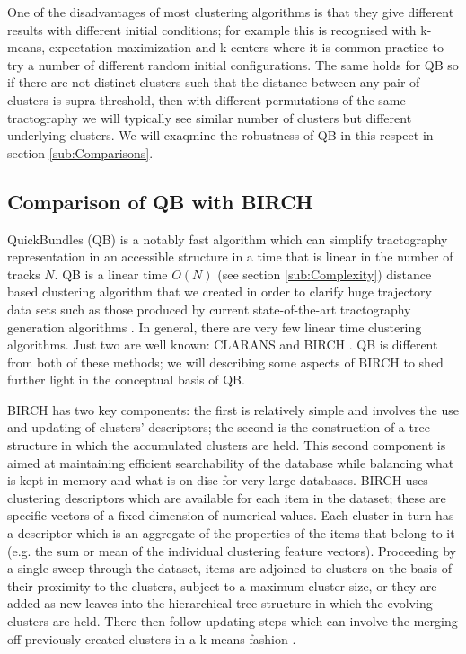\documentclass[preprint,authoryear,a4paper,10pt,onecolumn]{elsarticle}
\begin{document}
One of the disadvantages of most clustering algorithms is that they give
different results with different initial conditions; for example this is
recognised with k-means, expectation-maximization
\citep{dempster1977maximum} and k-centers \citep{gonzalez1985clustering}
where it is common practice to try a number of different random initial
configurations. The same holds for QB so if there are not distinct
clusters such that the distance between any pair of clusters is
supra-threshold, then with different permutations of the same
tractography we will typically see similar number of clusters but
different underlying clusters. We will exaqmine the robustness of QB in
this respect in section \ref{sub:Comparisons}.

\subsection{Comparison of QB with BIRCH}

QuickBundles (QB) is a notably fast algorithm which can simplify
tractography representation in an accessible structure in a time that is
linear in the number of tracks $N$. QB is a linear time $O(N)$ (see
section \ref{sub:Complexity}) distance based clustering algorithm that
we created in order to clarify huge trajectory data sets such as those
produced by current state-of-the-art tractography generation algorithms
\citep{Parker2003,WWS+08}. In general, there are very few linear time
clustering algorithms. Just two are well known: CLARANS
\citep{ng2002clarans} and BIRCH \citep{zhang1997birch}. QB is different
from both of these methods; we will describing some
aspects of BIRCH to shed further light in the conceptual basis of QB.

BIRCH has two key components: the first is relatively simple and involves
the use and updating of clusters' descriptors; the second is the
construction of a tree structure in which the accumulated clusters are
held. This second component is aimed at maintaining efficient
searchability of the database while balancing what is kept in memory and
what is on disc for very large databases. BIRCH uses clustering
descriptors which are available for each item in the dataset; these are
specific vectors of a fixed dimension of numerical values. Each cluster
in turn has a descriptor which is an aggregate of the properties of the
items that belong to it (e.g. the sum or mean of the individual
clustering feature vectors). Proceeding by a single sweep through the
dataset, items are adjoined to clusters on the basis of their proximity
to the clusters, subject to a maximum cluster size, or they are added as
new leaves into the hierarchical tree structure in which the evolving
clusters are held. There then follow updating steps which can involve
the merging off previously created clusters in a k-means
fashion \citep{steinhaus1956division,macqueen1967some}.
\end{document}
